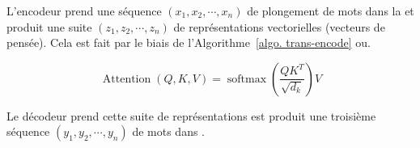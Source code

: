 L'encodeur prend une séquence \((x_1, x_2, \cdots, x_n)\) de plongement de mots dans la  
et produit une suite \((z_1, z_2, \cdots, z_n)\) de représentations vectorielles (vecteurs de pensée).
Cela est fait par le biais de l'Algorithme~\ref{algo. trans-encode} ou.

\[
    \operatorname{Attention}(Q, K, V)=\operatorname{softmax}\left(\frac{Q K^T}{\sqrt{d_k}}\right) V
\]
    
    

% 

Le décodeur prend cette suite de représentations est produit une troisième séquence 
\((y_1, y_2, \cdots, y_n)\)
de mots dans .
